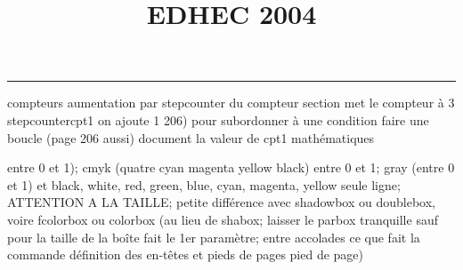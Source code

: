 \documentclass[11pt]{article}%
\title{\bf \vspace{-2cm} EDHEC 2004} %
\author{} %
\date{} %
\renewcommand{\headrulewidth}{0pt}%
\renewcommand{\footrulewidth}{0.4pt}%
\begin{document}
\maketitle %
\vspace{-1.4cm}\hrule %
\thispagestyle{fancy}

\vspace*{.2cm}



compteurs%
aumentation par stepcounter du compteur section%
met le compteur à 3%
stepcounter{cpt1} on ajoute 1%
206) pour subordonner à une condition %
faire une boucle (page 206 aussi) %
document la valeur de cpt1 
mathématiques\newcommand{\ch}{\operatorname{ch}} 
\newcommand{\sh}{\operatorname{sh}}
\renewcommand{\tanh}{\operatorname{th}}
\renewcommand{\sinh}{\operatorname{sh}}
\renewcommand{\cosh}{\operatorname{ch}}
\newcommand{\argsh}{\operatorname{argsh}}
\newcommand{\argch}{\operatorname{argch}}
\newcommand{\argth}{\operatorname{argth}}
\newcommand{\Id}{\operatorname{Id}}
\renewcommand{\leq}{\leq}
\renewcommand{\geq}{\geq }

\newcommand{\dlim}{\lim}
\newcommand{\dsum}{\sum}
\newcommand{\dprod}{\prod}



entre 0 et 1); cmyk (quatre cyan magenta yellow black) entre 0 et 1;
gray (entre 0 et 1) et black, white, red, green, blue, cyan, magenta,
yellow%
seule ligne; ATTENTION A LA TAILLE; petite différence avec shadowbox ou
doublebox, voire fcolorbox ou colorbox (au lieu de shabox; laisser le
parbox tranquille sauf pour la taille de la boîte
\newcommand{\Tbox}[1]{\begin{center} \shabox{\parbox{0.6
\linewidth}{#1}} \end{center}} %
fait le 1er paramètre; entre accolades ce que fait la commande
définition des en-têtes et pieds de pages\pagestyle{fancy}
\chead{}
\rfoot[ \ \thepage]{\thepage}
\cfoot{}
\lfoot{}
\thispagestyle{fancy} %
pied de page)\renewcommand{\footrulewidth}{0.4pt}
\renewcommand{\headrulewidth}{0.4pt}
\end{document}
